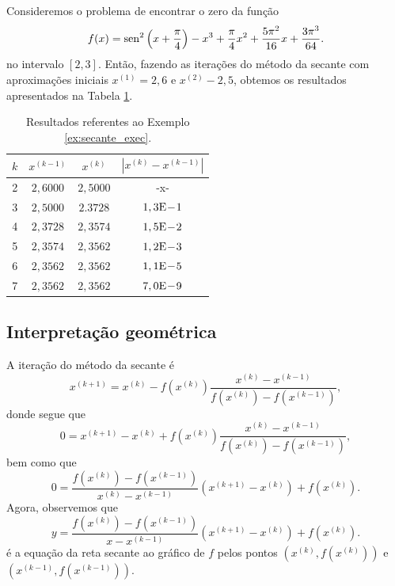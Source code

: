 \begin{ex}\label{ex:secante_exec}
  Consideremos o problema de encontrar o zero da função
  \begin{equation}
    f(x) = \operatorname{sen}^2\left(x+\frac{\pi}{4}\right) - x^3 + \frac{\pi}{4}x^2 + \frac{5\pi^2}{16}x + \frac{3\pi^3}{64}.
  \end{equation}
  no intervalo $[2,3]$. Então, fazendo as iterações do método da secante com aproximações iniciais $x^{(1)}=2,6$ e $x^{(2)}-2,5$, obtemos os resultados apresentados na Tabela \ref{tab:ex_secante_exec}.

\begin{table}[h!]
  \centering
  \caption{Resultados referentes ao Exemplo \ref{ex:secante_exec}.}
  \label{tab:ex_secante_exec}
  \begin{tabular}{r|ccc}
    $k$ & $x^{(k-1)}$ & $x^{(k)}$ & $|x^{(k)}-x^{(k-1)}|$ \\\hline
    2 & $2,6000$ & $2,5000$ & -x-\\
    3 & $2,5000$ & $2.3728$ & $1,3\mathrm{E}\!-\!1$ \\
    4 & $2,3728$ & $2,3574$ & $1,5\mathrm{E}\!-\!2$ \\
    5 & $2,3574$ & $2,3562$ & $1,2\mathrm{E}\!-\!3$ \\
    6 & $2,3562$ & $2,3562$ & $1,1\mathrm{E}\!-\!5$ \\
    7 & $2,3562$ & $2,3562$ & $7,0\mathrm{E}\!-\!9$ \\\hline
  \end{tabular}
\end{table}

% 
\end{ex}

\subsection{Interpretação geométrica}

A iteração do método da secante é
\begin{equation}
  x^{(k+1)} = x^{(k)} - f(x^{(k)})\frac{x^{(k)}-x^{(k-1)}}{f(x^{(k)})-f(x^{(k-1)})},
\end{equation}
donde segue que
\begin{equation}
  0 = x^{(k+1)}-x^{(k)} + f(x^{(k)})\frac{x^{(k)}-x^{(k-1)}}{f(x^{(k)})-f(x^{(k-1)})},
\end{equation}
bem como que
\begin{equation}\label{eq:secante_geointerp}
  0 = \frac{f(x^{(k)})-f(x^{(k-1)})}{x^{(k)}-x^{(k-1)}}(x^{(k+1)}-x^{(k)}) + f(x^{(k)}).
\end{equation}
Agora, observemos que
\begin{equation}
  y = \frac{f(x^{(k)})-f(x^{(k-1)})}{x-x^{(k-1)}}(x^{(k+1)}-x^{(k)}) + f(x^{(k)}).
\end{equation}
é a equação da reta secante ao gráfico de $f$ pelos pontos $(x^{(k)}, f(x^{(k)}))$ e $(x^{(k-1)}, f(x^{(k-1)}))$. 

